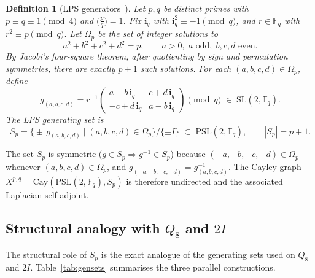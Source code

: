 \documentclass[11pt,a4paper]{article}
\newtheorem{definition}{Definition}
\begin{document}
    \begin{definition}[LPS generators~\cite{LPS1988}]
      \label{def:lps}
      Let $p, q$ be distinct primes with $p \equiv q \equiv 1 \pmod{4}$ and
      $\bigl(\frac{p}{q}\bigr) = 1$.
      Fix $\mathbf{i}_q$ with $\mathbf{i}_q^2 \equiv -1 \pmod{q}$, and
      $r \in \mathbb{F}_q$ with $r^2 \equiv p \pmod{q}$.
      Let $\Omega_p$ be the set of integer solutions to
      \begin{equation}
        a^2 + b^2 + c^2 + d^2 = p,
        \qquad a > 0,\; a \text{ odd},\; b, c, d \text{ even}.
        \label{eq:sum-of-4-squares}
      \end{equation}
      By Jacobi's four-square theorem, after quotienting by sign and permutation
      symmetries, there are exactly $p+1$ such solutions.
      For each $(a,b,c,d) \in \Omega_p$, define
      \begin{equation}
        g_{(a,b,c,d)}
        = r^{-1}
        \begin{pmatrix}
          a + b\,\mathbf{i}_q & c + d\,\mathbf{i}_q \\
          -c + d\,\mathbf{i}_q & a - b\,\mathbf{i}_q
        \end{pmatrix}
        \pmod{q}
        \;\in\; \mathrm{SL}(2,\mathbb{F}_q).
        \label{eq:lps-generator}
      \end{equation}
      The LPS generating set is
      \begin{equation}
        S_p = \bigl\{ \pm\, g_{(a,b,c,d)} \mid (a,b,c,d) \in \Omega_p \bigr\}
        \big/\{\pm I\}
        \;\subset\; \mathrm{PSL}(2,\mathbb{F}_q),
        \qquad |S_p| = p+1.
        \label{eq:S-SL2}
      \end{equation}
    \end{definition}

    The set $S_p$ is symmetric ($g \in S_p \Rightarrow g^{-1} \in S_p$)
    because $(-a,-b,-c,-d) \in \Omega_p$ whenever $(a,b,c,d) \in \Omega_p$,
    and $g_{(-a,-b,-c,-d)} = g_{(a,b,c,d)}^{-1}$.
    The Cayley graph $X^{p,q} = \mathrm{Cay}(\mathrm{PSL}(2,\mathbb{F}_q), S_p)$
    is therefore undirected and the associated Laplacian self-adjoint.

  \subsection{Structural analogy with $Q_8$ and $2I$}
    \label{sec:step6a-analogy}

    The structural role of $S_p$ is the exact analogue of the generating sets
    used on $Q_8$ and $2I$.
    Table~\ref{tab:gensets} summarises the three parallel constructions.
\end{document}
